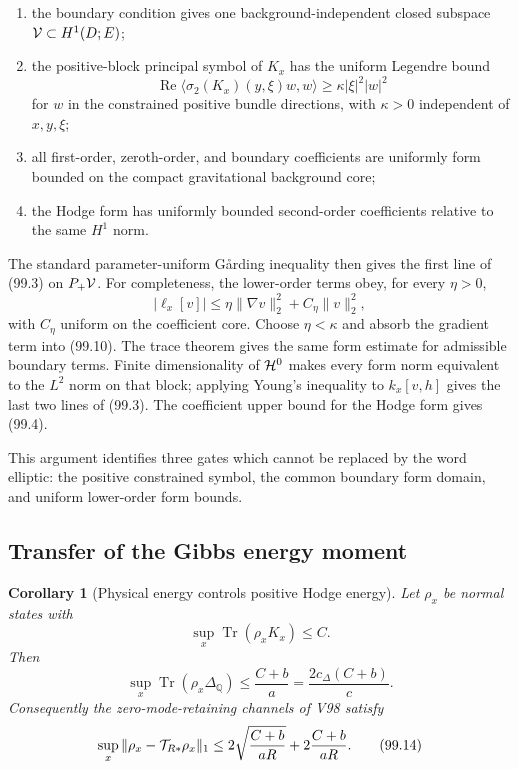 \documentclass[11pt]{article}
\newtheorem{corollary}[theorem]{Corollary}
\theoremstyle{remark}
\begin{document}
\begin{enumerate}
\item the boundary condition gives one background-independent
closed subspace \({\cal V}\subset H^1(D;E)\);
\item the positive-block principal symbol of \(K_x\) has the uniform
Legendre bound
\[
 \operatorname{Re}
 \langle\sigma_2(K_x)(y,\xi)w,w\rangle
 \geq\kappa|\xi|^2|w|^2                                       \tag{99.10}
\]
for \(w\) in the constrained positive bundle directions, with
\(\kappa>0\) independent of \(x,y,\xi\);
\item all first-order, zeroth-order, and boundary coefficients are
uniformly form bounded on the compact gravitational background
core;
\item the Hodge form has uniformly bounded second-order
coefficients relative to the same \(H^1\) norm.
\end{enumerate}

The standard parameter-uniform G{\aa}rding inequality then gives
the first line of (99.3) on \(P_+{\cal V}\).  For completeness, the
lower-order terms obey, for every \(\eta>0\),
\[
 |\ell_x[v]|
 \leq\eta\|\nabla v\|_2^2+C_\eta\|v\|_2^2,                     \tag{99.11}
\]
with \(C_\eta\) uniform on the coefficient core.  Choose
\(\eta<\kappa\) and absorb the gradient term into (99.10).  The
trace theorem gives the same form estimate for admissible boundary
terms.  Finite dimensionality of \({\cal H}^0\) makes every form
norm equivalent to the \(L^2\) norm on that block; applying Young's
inequality to \(k_x[v,h]\) gives the last two lines of (99.3).
The coefficient upper bound for the Hodge form gives (99.4).

This argument identifies three gates which cannot be replaced by the
word elliptic: the positive constrained symbol, the common boundary
form domain, and uniform lower-order form bounds.

\subsection{Transfer of the Gibbs energy moment}

\begin{corollary}[Physical energy controls positive Hodge energy]
\label{cor:v12v99-moment}
Let \(\rho_x\) be normal states with
\[
 \sup_x\operatorname{Tr}(\rho_xK_x)\leq C.                      \tag{99.12}
\]
Then
\[
 \sup_x\operatorname{Tr}(\rho_x\Delta_{\mathbb Q})
 \leq \frac{C+b}{a}
 =\frac{2c_\Delta(C+b)}{c}.                                    \tag{99.13}
\]
Consequently the zero-mode-retaining channels of V98 satisfy
\[
 \sup_x\|\rho_x-{\cal T}_{R*}\rho_x\|_1
 \leq
 2\sqrt{\frac{C+b}{aR}}+
 2\frac{C+b}{aR}.                                               \tag{99.14}
\]
\end{corollary}
\end{document}
